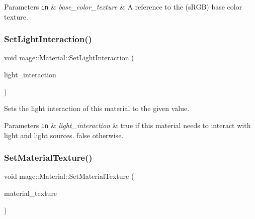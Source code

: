 \begin{DoxyParams}[1]{Parameters}
\mbox{\tt in}  & {\em base\+\_\+color\+\_\+texture} & A reference to the (s\+R\+GB) base color texture. \\
\hline
\end{DoxyParams}
\hypertarget{structmage_1_1_material_a9b0bcb448cf9c96bcb63dcbc0f110bd1}{}\label{structmage_1_1_material_a9b0bcb448cf9c96bcb63dcbc0f110bd1} 
\subsubsection{\texorpdfstring{Set\+Light\+Interaction()}{SetLightInteraction()}}
{\footnotesize\ttfamily void mage\+::\+Material\+::\+Set\+Light\+Interaction (\begin{DoxyParamCaption}\item[{bool}]{light\+\_\+interaction }\end{DoxyParamCaption})\hspace{0.3cm}{\ttfamily [noexcept]}}

Sets the light interaction of this material to the given value.


\begin{DoxyParams}[1]{Parameters}
\mbox{\tt in}  & {\em light\+\_\+interaction} & {\ttfamily true} if this material needs to interact with light and light sources. {\ttfamily false} otherwise. \\
\hline
\end{DoxyParams}
\hypertarget{structmage_1_1_material_a8f88eda4c45268bf6a30878948055ff5}{}\label{structmage_1_1_material_a8f88eda4c45268bf6a30878948055ff5} 
\subsubsection{\texorpdfstring{Set\+Material\+Texture()}{SetMaterialTexture()}}
{\footnotesize\ttfamily void mage\+::\+Material\+::\+Set\+Material\+Texture (\begin{DoxyParamCaption}\item[{const \hyperlink{namespacemage_a1e01ae66713838a7a67d30e44c67703e}{Shared\+Ptr}$<$ const \hyperlink{classmage_1_1_texture}{Texture} $>$ \&}]{material\+\_\+texture }\end{DoxyParamCaption})}

